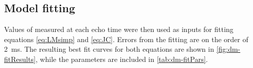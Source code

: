 \subsection{Model fitting}

Values of \Ttwo measured at each echo time were then used as inputs for fitting equations \ref{eq:LMsimp} and \ref{eq:JC}.
Errors from the \Ttwo fitting are on the order of \SI{2}{ms}.
The resulting best fit curves for both equations are shown in \autoref{fig:dm-fitResults}, while the parameters are included in \autoref{tab:dm-fitPars}.

\begin{landscape}
\begin{table}[h]
\centering

\caption[Best fit values to the experimental data at different fields]{Best fit values to the experimental data at different fields, shaded columns indicate fixed parameters in fitting. Note that the \TtwoO values are going to be dependent on the state of the blood in the flow circuit, so are not necessarily reflective of the diffusion/exchange effects.}
\label{tab:dm-fitPars}



\vspace{1cm}

\end{table}
\end{landscape}
